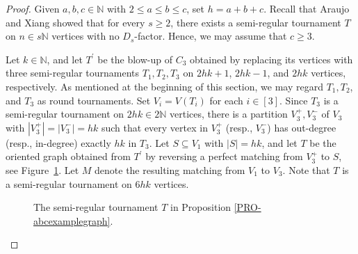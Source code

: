 \documentclass[11pt,a4paper,reqno]{amsart}
\theoremstyle{definition} %
\begin{document}
\begin{proof}
Given $a,b,c\in \mathbb{N}$ with $2\leqslant a\leqslant b\leqslant c$, set $h=a+b+c$. Recall that Araujo and Xiang \cite{araujoARXIV2025} showed that for every $s\geqslant 2$, there exists a semi-regular tournament $T$ on $n\in s\mathbb{N}$ vertices with no $D_s$-factor. Hence, we may assume that $c\geqslant 3$.

Let $k\in \mathbb{N}$, and let $T^\prime$ be the blow-up of $C_3$ obtained by replacing its vertices with three semi-regular tournaments $T_1,T_2,T_3$ on $2hk+1$, $2hk-1$, and $2hk$ vertices, respectively. As mentioned at the beginning of this section, we may regard $T_1,T_2$, and $T_3$ as round tournaments. Set $V_i=V(T_i)$ for each $i\in[3]$. Since $T_3$ is a semi-regular tournament on $2hk\in 2\mathbb{N}$ vertices, there is a partition $V_3^+,V_3^-$ of $V_3$ with $|V_3^+|=|V_3^-|=hk$ such that every vertex in $V_3^+$ (resp., $V_3^-$) has out-degree (resp., in-degree) exactly $hk$ in $T_3$. Let $S\subseteq V_1$ with $|S|=hk$, and let $T$ be the oriented graph obtained from $T^\prime$ by reversing a perfect matching from $V_3^+$ to $S$, see Figure~\ref{FIG-prop16}. Let $M$ denote the resulting matching from $V_1$ to $V_3$. Note that $T$ is a semi-regular tournament on $6hk$ vertices.

\begin{figure}[!ht]
\centering
        \caption{The semi-regular tournament $T$ in Proposition \ref{PRO-abcexamplegraph}.}
        \label{FIG-prop16}
    \end{figure}


\end{proof}
\end{document}
